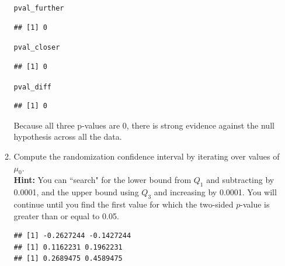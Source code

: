 \documentclass{article}\usepackage[]{graphicx}\usepackage[]{xcolor}
\makeatletter
\newcommand{\hldef}[1]{\textcolor[rgb]{0.345,0.345,0.345}{#1}}%
\newenvironment{kframe}{%
 \def\at@end@of@kframe{}%
 \ifinner\ifhmode%
  \def\at@end@of@kframe{\end{minipage}}%
  \begin{minipage}{\columnwidth}%
 \fi\fi%
 \def\FrameCommand##1{\hskip\@totalleftmargin \hskip-\fboxsep
 \colorbox{shadecolor}{##1}\hskip-\fboxsep
     \hskip-\linewidth \hskip-\@totalleftmargin \hskip\columnwidth}%
 \MakeFramed {\advance\hsize-\width
   \@totalleftmargin\z@ \linewidth\hsize
   \@setminipage}}%
 {\par\unskip\endMakeFramed%
 \at@end@of@kframe}
\newenvironment{knitrout}{}{} %
\makeatother
\begin{document}
\begin{enumerate}
\begin{enumerate}
\begin{knitrout}
\begin{kframe}
\begin{alltt}
\hldef{pval_further}
\end{alltt}
\begin{verbatim}
## [1] 0
\end{verbatim}
\begin{alltt}
\hldef{pval_closer}
\end{alltt}
\begin{verbatim}
## [1] 0
\end{verbatim}
\begin{alltt}
\hldef{pval_diff}
\end{alltt}
\begin{verbatim}
## [1] 0
\end{verbatim}
\end{kframe}
\end{knitrout}
  
Because all three p-values are 0, there is strong evidence against the null hypothesis across all the data.
  
  
  \item Compute the randomization confidence interval by iterating over values of $\mu_0$.\\
  \textbf{Hint:} You can ``search" for the lower bound from $Q_1$ and subtracting by 0.0001, 
  and the upper bound using $Q_3$ and increasing by 0.0001. You will continue until you find 
  the first value for which the two-sided $p$-value is greater than or equal to 0.05.
\begin{knitrout}
\color{fgcolor}\begin{kframe}
\begin{verbatim}
## [1] -0.2627244 -0.1427244
## [1] 0.1162231 0.1962231
## [1] 0.2689475 0.4589475
\end{verbatim}
\end{kframe}
\end{knitrout}




\end{enumerate}
\end{enumerate}
\end{document}

